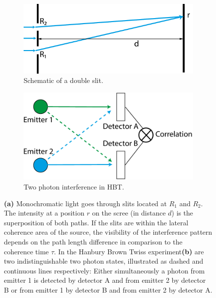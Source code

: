 \begin{figure}
	\centering
	\begin{subfigure}[b]{0.53\textwidth}
	\includegraphics[width=\linewidth]{images/doubleslit.pdf}
	\caption[Schematic of a double slit]{Schematic of a double slit.}
	\label{fig:doubleslit}
	\end{subfigure}
\begin{subfigure}[b]{0.41\textwidth}
	\includegraphics[width=\linewidth]{images/correlation.pdf}
	\caption{Two photon interference in HBT.}
	\label{fig:twophoton}
\end{subfigure}
\caption[Schematic of double slit and two photon interference in  HBT experiments]{\textbf{(a)} Monochromatic light goes through slits located at $R_1$ and $R_2$. The intensity at a position $r$ on the scree (in distance $d$) is the superposition of both paths.  If the slits are within the lateral coherence area of the source, the visibility of the interference pattern depends on the path length difference in comparison to the coherence time $\tau$.
In the Hanbury Brown Twiss experiment\textbf{(b)} are two indistinguishable two photon states, illustrated as dashed and  continuous lines respectively: Either simultaneously a photon from emitter 1 is detected by detector A and from emitter 2 by detector B or from emitter 1 by detector B and from emitter 2 by detector A.}
\end{figure}



